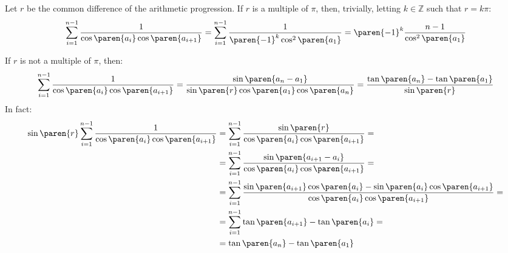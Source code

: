 Let $r$ be the common difference of the arithmetic progression.
If $r$ is a multiple of $\pi$, then, trivially, letting $k \in \mathbb{Z}$ such that $r = k \pi$:
\begin{equation*}
  \sum\limits_{i = 1}^{n - 1} {\frac{1}{\cos\paren{a_i} \cos\paren{a_{i+1}}}}
  = \sum\limits_{i = 1}^{n - 1} {\frac{1}{\paren{-1}^k \cos^2\paren{a_1}}}
  = \paren{-1}^k \frac{n - 1}{\cos^2\paren{a_1}}
\end{equation*}

If $r$ is not a multiple of $\pi$, then:
\begin{equation*}
  \sum\limits_{i = 1}^{n - 1} {\frac{1}{\cos\paren{a_i} \cos\paren{a_{i+1}}}}
  = \frac{\sin\paren{a_n - a_1}}{\sin\paren{r} \cos\paren{a_1} \cos\paren{a_n}}
  = \frac{\tan\paren{a_n} - \tan\paren{a_1}}{\sin\paren{r}}
\end{equation*}
In fact:
\begin{align*}
  \sin\paren{r}
  \sum\limits_{i = 1}^{n - 1} {\frac{1}{\cos\paren{a_i} \cos\paren{a_{i+1}}}}
  &= \sum\limits_{i = 1}^{n - 1} {\frac{\sin\paren{r}}{\cos\paren{a_i} \cos\paren{a_{i+1}}}} = \\
  &= \sum\limits_{i = 1}^{n - 1} {\frac{\sin\paren{a_{i+1} - a_{i}}}{\cos\paren{a_i} \cos\paren{a_{i+1}}}} = \\
  &= \sum\limits_{i = 1}^{n - 1} {\frac{\sin\paren{a_{i+1}} \cos\paren{a_i} - \sin\paren{a_i} \cos\paren{a_{i+1}}}
                                       {\cos\paren{a_i} \cos\paren{a_{i+1}}}} = \\
  &= \sum\limits_{i = 1}^{n - 1} {\tan\paren{a_{i+1}} - \tan\paren{a_i}} = \\
  &= \tan\paren{a_{n}} - \tan\paren{a_{1}}
\end{align*}

